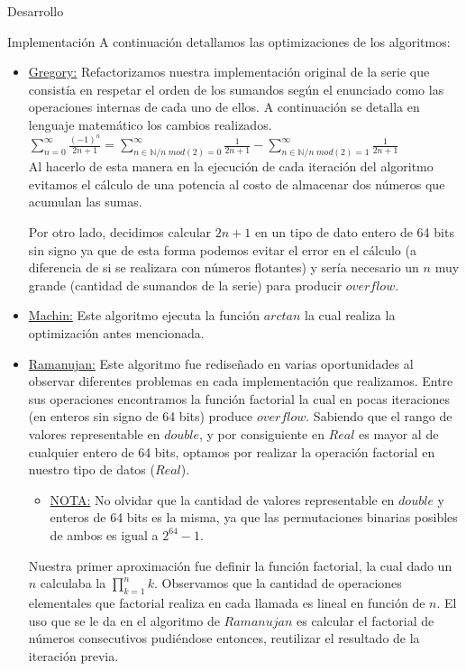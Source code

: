 \begin{section}{Desarrollo}
\begin{subsection}{Implementación}
	   A continuación detallamos las optimizaciones de los algoritmos:

		\begin{itemize}
			\item \underline{Gregory:} Refactorizamos nuestra implementación original de la serie que consistía en respetar el orden de los sumandos según el enunciado como las operaciones internas de cada uno de ellos. A continuación se detalla en lenguaje matemático los cambios realizados.\\
							
				$\sum_{n=0}^{\infty}\frac{(-1)^n}{2n+1} = \sum_{n \in \mathbb{N} / n\;mod(2)=0}^{\infty}\frac{1}{2n+1}-\sum_{n \in \mathbb{N} / n\;mod(2)=1}^{\infty}\frac{1}{2n+1}$\\
				
				Al hacerlo de esta manera en la ejecución de cada iteración del algoritmo evitamos el cálculo de una potencia al costo de almacenar dos números que acumulan las sumas.
				
				Por otro lado, decidimos calcular $2n+1$ en un tipo de dato entero de 64 bits sin signo ya que de esta forma podemos evitar el error en el cálculo (a diferencia de si se realizara con números flotantes) y sería necesario un $n$ muy grande (cantidad de sumandos de la serie) para producir $overflow$.
				
			\item \underline{Machin:} Este algoritmo ejecuta la función $arctan$ la cual realiza la optimización antes mencionada.
			
			\item \underline{Ramanujan:} Este algoritmo fue rediseñado en varias oportunidades al observar diferentes problemas en cada implementación que realizamos. Entre sus operaciones encontramos la función factorial la cual en pocas iteraciones (en enteros sin signo de 64 bits) produce $overflow$. Sabiendo que el rango de valores representable en $double$, y por consiguiente en $Real$ es mayor al de cualquier entero de 64 bits, optamos por realizar la operación factorial en nuestro tipo de datos ($Real$).
			
			\begin{itemize}
				\item \underline{NOTA:} No olvidar que la cantidad de valores representable en $double$ y enteros de 64 bits es la misma, ya que las permutaciones binarias posibles de ambos es igual a $2^{64}-1$.\\
			\end{itemize}
		Nuestra primer aproximación fue definir la función factorial, la cual dado un $n$ calculaba la $\prod_{k=1}^{n}{k}$. Observamos que la cantidad de operaciones elementales que factorial realiza en cada llamada es lineal en función de $n$. El uso que se le da en el algoritmo de $Ramanujan$ es calcular el factorial de números consecutivos pudiéndose entonces, reutilizar el resultado de la iteración previa.\VSP
		

\end{itemize}
\end{subsection}
\end{section}
